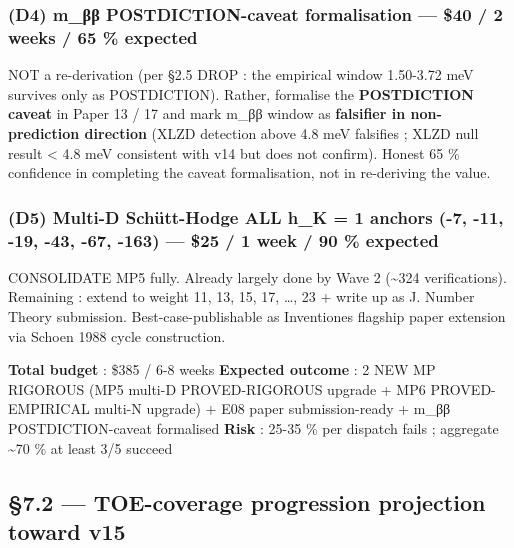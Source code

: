 \documentclass[
  11pt,
  a4paper,
]{article}
\begin{document}
\hypertarget{d4-m_ux3b2ux3b2-postdiction-caveat-formalisation-40-2-weeks-65-expected}{%
\subsubsection{(D4) m\_ββ POSTDICTION-caveat formalisation --- \$40 / 2 weeks / 65 \% expected}\label{d4-m_ux3b2ux3b2-postdiction-caveat-formalisation-40-2-weeks-65-expected}}

NOT a re-derivation (per §2.5 DROP : the empirical window 1.50-3.72 meV survives only as POSTDICTION). Rather, formalise the \textbf{POSTDICTION caveat} in Paper 13 / 17 and mark m\_ββ window as \textbf{falsifier in non-prediction direction} (XLZD detection above 4.8 meV falsifies ; XLZD null result \textless{} 4.8 meV consistent with v14 but does not confirm). Honest 65 \% confidence in completing the caveat formalisation, not in re-deriving the value.

\hypertarget{d5-multi-d-schuxfctt-hodge-all-h_k-1-anchors--7--11--19--43--67--163-25-1-week-90-expected}{%
\subsubsection{(D5) Multi-D Schütt-Hodge ALL h\_K = 1 anchors (-7, -11, -19, -43, -67, -163) --- \$25 / 1 week / 90 \% expected}\label{d5-multi-d-schuxfctt-hodge-all-h_k-1-anchors--7--11--19--43--67--163-25-1-week-90-expected}}

CONSOLIDATE MP5 fully. Already largely done by Wave 2 (\textasciitilde324 verifications). Remaining : extend to weight 11, 13, 15, 17, \ldots, 23 + write up as J. Number Theory submission. Best-case-publishable as Inventiones flagship paper extension via Schoen 1988 cycle construction.

\textbf{Total budget} : \$385 / 6-8 weeks
\textbf{Expected outcome} : 2 NEW MP RIGOROUS (MP5 multi-D PROVED-RIGOROUS upgrade + MP6 PROVED-EMPIRICAL multi-N upgrade) + E08 paper submission-ready + m\_ββ POSTDICTION-caveat formalised
\textbf{Risk} : 25-35 \% per dispatch fails ; aggregate \textasciitilde70 \% at least 3/5 succeed

\hypertarget{toe-coverage-progression-projection-toward-v15}{%
\subsection{§7.2 --- TOE-coverage progression projection toward v15}\label{toe-coverage-progression-projection-toward-v15}}
\end{document}
